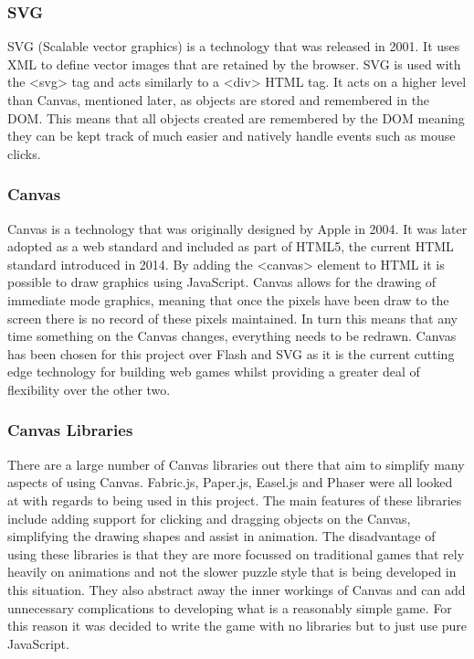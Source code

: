 \documentclass[12pt,a4paper]{report}
\begin{document}
\subsubsection{SVG}
SVG (Scalable vector graphics) is a technology that was released in 2001. 
It uses XML to define vector images that are retained by the browser. SVG is used with the <svg> tag and acts similarly to a <div> HTML tag. It acts on a higher level than Canvas, mentioned later, as objects are stored and remembered in the DOM. This means that all objects created are remembered by the DOM meaning they can be kept track of much easier and natively handle events such as mouse clicks.

\subsubsection{Canvas}
Canvas is a technology that was originally designed by Apple in 2004. It was later adopted as a web standard and included as part of HTML5, the current HTML standard introduced in 2014. By adding the <canvas> element to HTML it is possible to draw graphics using JavaScript. Canvas allows for the drawing of immediate mode graphics, meaning that once the pixels have been draw to the screen there is no record of these pixels maintained. In turn this means that any time something on the Canvas changes, everything needs to be redrawn. Canvas has been chosen for this project over Flash and SVG as it is the current cutting edge technology for building web games whilst providing a greater deal of flexibility over the other two.

\subsubsection{Canvas Libraries}
There are a large number of Canvas libraries out there that aim to simplify many aspects of using Canvas. Fabric.js, Paper.js, Easel.js and Phaser were all looked at with regards to being used in this project. The main features of these libraries include adding support for clicking and dragging objects on the Canvas, simplifying the drawing shapes and assist in animation.
The disadvantage of using these libraries is that they are more focussed on traditional games that rely heavily on animations and not the slower puzzle style that is being developed in this situation. They also abstract away the inner workings of Canvas and can add unnecessary complications to developing what is a reasonably simple game. For this reason it was decided to write the game with no libraries but to just use pure JavaScript.
\end{document}
